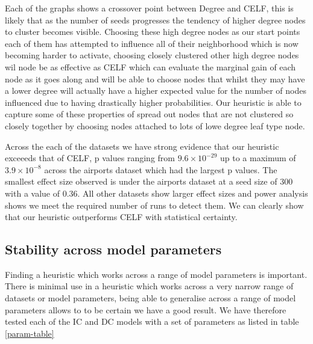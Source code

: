 \documentclass{article}
\begin{document}
Each of the graphs shows a crossover point between Degree and CELF, this is likely that as the number of seeds progresses the tendency of higher degree nodes to cluster becomes visible.
Choosing these high degree nodes as our start points each of them has attempted to influence all of their neighborhood which is now becoming harder to activate, choosing closely clustered other high degree nodes wil node be as effective as CELF which can evaluate the marginal gain of each node as it goes along and will be able to choose nodes that whilst they may have a lower degree will actually have a higher expected value for the number of nodes influenced due to having drastically higher probabilities.
Our heuristic is able to capture some of these properties of spread out nodes that are not clustered so closely together by choosing nodes attached to lots of lowe degree leaf type node.

\vspace{1em}

Across the each of the datasets we have strong evidence that our heuristic exceeeds that of CELF, p values ranging from $9.6 \times 10^{-29}$ up to a maximum of $3.9 \times 10^{-8}$ across the airports dataset which had the largest p values.
The smallest effect size observed is under the airports dataset at a seed size of 300 with a value of 0.36.
All other datasets show larger effect sizes and power analysis shows we meet the required number of runs to detect them.
We can clearly show that our heuristic outperforms CELF with statistical certainty.

\subsection{Stability across model parameters}
Finding a heuristic which works across a range of model parameters is important.
There is minimal use in a heuristic which works across a very narrow range of datasets or model parameters, being able to generalise across a range of model parameters allows to to be certain we have a good result.
We have therefore tested each of the IC and DC models with a set of parameters as listed in table \ref{param-table}
\end{document}
